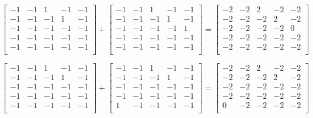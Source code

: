 \documentclass[IN,11pt,twoside,openright,bachelor,english]{tumthesis}
\begin{document}
\[

\begin{bmatrix}
-1 & -1 & 1 & -1 & -1 \\
-1 & -1 & -1 & 1 & -1 \\
-1 & -1 & -1 & -1 & -1 \\
-1 & -1 & -1 & -1 & -1 \\
-1 & -1 & -1 & -1 & -1 \\
\end{bmatrix}
+
\begin{bmatrix}
-1 & -1 & 1 & -1 & -1 \\
-1 & -1 & -1 & 1 & -1 \\
-1 & -1 & -1 & -1 & 1 \\
-1 & -1 & -1 & -1 & -1 \\
-1 & -1 & -1 & -1 & -1 \\
\end{bmatrix}
=
\begin{bmatrix}
-2 & -2 & 2 & -2 & -2 \\
-2 & -2 & -2 & 2 & -2 \\
-2 & -2 & -2 & -2 & 0 \\
-2 & -2 & -2 & -2 & -2 \\
-2 & -2 & -2 & -2 & -2 \\
\end{bmatrix}
\]



\[
\begin{bmatrix}
-1 & -1 & 1 & -1 & -1 \\
-1 & -1 & -1 & 1 & -1 \\
-1 & -1 & -1 & -1 & -1 \\
-1 & -1 & -1 & -1 & -1 \\
-1 & -1 & -1 & -1 & -1 \\
\end{bmatrix}
+
\begin{bmatrix}
-1 & -1 & 1 & -1 & -1 \\
-1 & -1 & -1 & 1 & -1 \\
-1 & -1 & -1 & -1 & -1 \\
-1 & -1 & -1 & -1 & -1 \\
1 & -1 & -1 & -1 & -1 \\
\end{bmatrix}
=
\begin{bmatrix}
-2 & -2 & 2 & -2 & -2 \\
-2 & -2 & -2 & 2 & -2 \\
-2 & -2 & -2 & -2 & -2 \\
-2 & -2 & -2 & -2 & -2 \\
0 & -2 & -2 & -2 & -2 \\
\end{bmatrix}
\]
\end{document}
